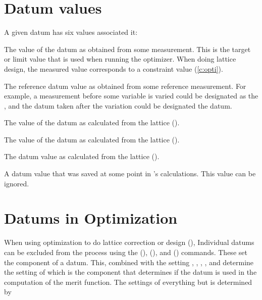 \section{Datum values}
\label{s:datum.values}

A given datum has six values associated it:
\vspace{-2ex}
\begin{description}
  \vspace{-1ex}
  \item[meas] \Newline 
The value of the datum as obtained from some measurement. This is the
target or limit value that is used when running the optimizer. When
doing lattice design, the measured value corresponds to a constraint
value (\ref{c:opti}).
  \vspace{-1ex}
  \item[ref] \Newline
The reference datum value as obtained from some reference measurement. For example,
a measurement before some variable is varied could be designated as
the , and the datum taken after the variation could be 
designated the  datum.
  \vspace{-0.5ex}
  \item[model] \Newline
The value of the datum as calculated from the  lattice ().
  \vspace{-0.5ex}
  \item[design] \Newline
The value of the datum as calculated from the  lattice ().
  \vspace{-0.5ex}
  \item[base] \Newline
The datum value as calculated from the  lattice ().
  \vspace{-0.5ex}
  \item[old] \Newline
A datum value that was saved at some point in \tao's calculations. This value
can be ignored.
\end{description}

\section{Datums in Optimization}
\label{s:datum.opt}

When using optimization to do lattice correction or design
(), Individual datums can be excluded from the process
using the  (),  (),
and  () commands. These set the 
component of a datum. This, combined with the setting ,
, , , and 
determine the setting of  which is the component that
determines if the datum is used in the computation of the merit
function. The settings of everything but  is determined
by \tao

